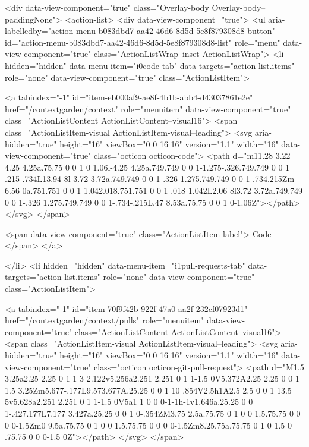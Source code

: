       <div data-view-component="true" class="Overlay-body Overlay-body--paddingNone">          <action-list>
  <div data-view-component="true">
    <ul aria-labelledby="action-menu-b083dbd7-aa42-46d6-8d5d-5e8f879308d8-button" id="action-menu-b083dbd7-aa42-46d6-8d5d-5e8f879308d8-list" role="menu" data-view-component="true" class="ActionListWrap--inset ActionListWrap">
        <li hidden="hidden" data-menu-item="i0code-tab" data-targets="action-list.items" role="none" data-view-component="true" class="ActionListItem">
    
    
    <a tabindex="-1" id="item-eb000af9-ae8f-4b1b-abb4-d43037861e2e" href="/contextgarden/context" role="menuitem" data-view-component="true" class="ActionListContent ActionListContent--visual16">
        <span class="ActionListItem-visual ActionListItem-visual--leading">
          <svg aria-hidden="true" height="16" viewBox="0 0 16 16" version="1.1" width="16" data-view-component="true" class="octicon octicon-code">
    <path d="m11.28 3.22 4.25 4.25a.75.75 0 0 1 0 1.06l-4.25 4.25a.749.749 0 0 1-1.275-.326.749.749 0 0 1 .215-.734L13.94 8l-3.72-3.72a.749.749 0 0 1 .326-1.275.749.749 0 0 1 .734.215Zm-6.56 0a.751.751 0 0 1 1.042.018.751.751 0 0 1 .018 1.042L2.06 8l3.72 3.72a.749.749 0 0 1-.326 1.275.749.749 0 0 1-.734-.215L.47 8.53a.75.75 0 0 1 0-1.06Z"></path>
</svg>
        </span>
      
        <span data-view-component="true" class="ActionListItem-label">
          Code
</span>      
</a>
  
</li>
        <li hidden="hidden" data-menu-item="i1pull-requests-tab" data-targets="action-list.items" role="none" data-view-component="true" class="ActionListItem">
    
    
    <a tabindex="-1" id="item-70f9f42b-922f-47a0-aa2f-232cf07923d1" href="/contextgarden/context/pulls" role="menuitem" data-view-component="true" class="ActionListContent ActionListContent--visual16">
        <span class="ActionListItem-visual ActionListItem-visual--leading">
          <svg aria-hidden="true" height="16" viewBox="0 0 16 16" version="1.1" width="16" data-view-component="true" class="octicon octicon-git-pull-request">
    <path d="M1.5 3.25a2.25 2.25 0 1 1 3 2.122v5.256a2.251 2.251 0 1 1-1.5 0V5.372A2.25 2.25 0 0 1 1.5 3.25Zm5.677-.177L9.573.677A.25.25 0 0 1 10 .854V2.5h1A2.5 2.5 0 0 1 13.5 5v5.628a2.251 2.251 0 1 1-1.5 0V5a1 1 0 0 0-1-1h-1v1.646a.25.25 0 0 1-.427.177L7.177 3.427a.25.25 0 0 1 0-.354ZM3.75 2.5a.75.75 0 1 0 0 1.5.75.75 0 0 0 0-1.5Zm0 9.5a.75.75 0 1 0 0 1.5.75.75 0 0 0 0-1.5Zm8.25.75a.75.75 0 1 0 1.5 0 .75.75 0 0 0-1.5 0Z"></path>
</svg>
        </span>
      
